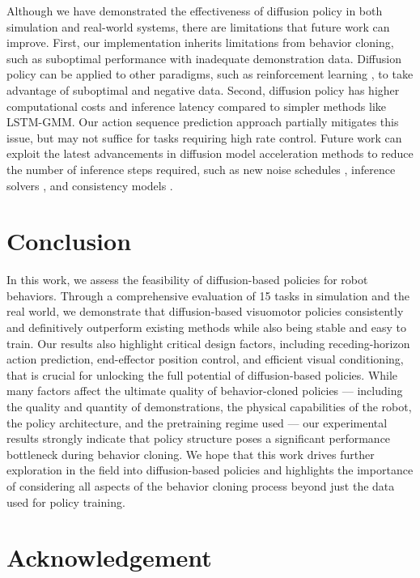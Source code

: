 \documentclass[Afour,sageh,times]{sagej}
\begin{document}
Although we have demonstrated the effectiveness of diffusion policy in both simulation and real-world systems, there are limitations that future work can improve.
First, our implementation inherits limitations from behavior cloning, such as suboptimal performance with inadequate demonstration data. Diffusion policy can be applied to other paradigms, such as reinforcement learning \cite{wang2023diffusion,hansen2023idql}, to take advantage of suboptimal and negative data.
Second, diffusion policy has higher computational costs and inference latency compared to simpler methods like LSTM-GMM. Our action sequence prediction approach partially mitigates this issue, but may not suffice for tasks requiring high rate control. Future work can exploit the latest advancements in diffusion model acceleration methods to reduce the number of inference steps required, such as new noise schedules \cite{chen2023importance}, inference solvers \cite{karras2022elucidating}, and consistency models \cite{song2023consistency}.


\section{Conclusion}

In this work, we assess the feasibility of diffusion-based policies for robot behaviors. Through a comprehensive evaluation of 15 tasks in simulation and the real world, we demonstrate that diffusion-based visuomotor policies consistently and definitively outperform existing methods while also being stable and easy to train. Our results also highlight critical design factors, including receding-horizon action prediction, end-effector position control, and efficient visual conditioning, that is crucial for unlocking the full potential of diffusion-based policies. While many factors affect the ultimate quality of behavior-cloned policies --- including the quality and quantity of demonstrations, the physical capabilities of the robot, the policy architecture, and the pretraining regime used --- our experimental results strongly indicate that policy structure poses a significant performance bottleneck during behavior cloning. We hope that this work drives further exploration in the field into diffusion-based policies and highlights the importance of considering all aspects of the behavior cloning process beyond just the data used for policy training.


\section{Acknowledgement}
\end{document}
